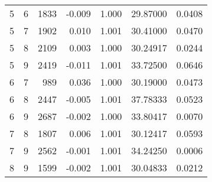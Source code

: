\begin{longtable}{rrrrrrr}
5 & 6 & 1833 & -0.009 & 1.000 & 29.87000 & 0.0408 \\ 
5 & 7 & 1902 & 0.010 & 1.001 & 30.41000 & 0.0470 \\ 
5 & 8 & 2109 & 0.003 & 1.000 & 30.24917 & 0.0244 \\ 
5 & 9 & 2419 & -0.011 & 1.001 & 33.72500 & 0.0646 \\ 
6 & 7 & 989 & 0.036 & 1.000 & 30.19000 & 0.0473 \\ 
6 & 8 & 2447 & -0.005 & 1.001 & 37.78333 & 0.0523 \\ 
6 & 9 & 2687 & -0.002 & 1.000 & 33.80417 & 0.0070 \\ 
7 & 8 & 1807 & 0.006 & 1.001 & 30.12417 & 0.0593 \\ 
7 & 9 & 2562 & -0.001 & 1.001 & 34.24250 & 0.0006 \\ 
8 & 9 & 1599 & -0.002 & 1.001 & 30.04833 & 0.0212 \\ 
\bottomrule
\end{longtable}

